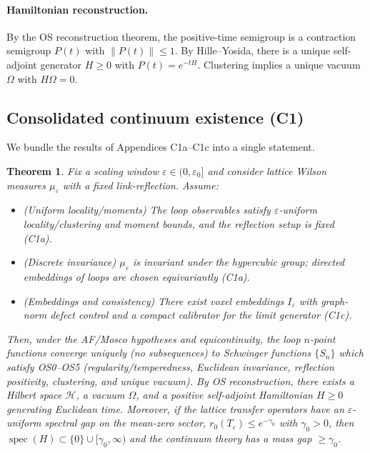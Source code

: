 \documentclass[11pt]{amsart}
\theoremstyle{plain}
\newtheorem{theorem}{Theorem}[section]
\theoremstyle{definition}
\theoremstyle{remark}
\begin{document}
\paragraph{Hamiltonian reconstruction.}
By the OS reconstruction theorem, the positive-time semigroup is a contraction semigroup $P(t)$ with $\lVert P(t)\rVert\le 1$. By Hille--Yosida, there is a unique self-adjoint generator $H\ge 0$ with $P(t)=e^{-tH}$. Clustering implies a unique vacuum $\Omega$ with $H\Omega=0$.

\subsection*{Consolidated continuum existence (C1)}

We bundle the results of Appendices C1a--C1c into a single statement.

\begin{theorem}
Fix a scaling window $\varepsilon\in(0,\varepsilon_0]$ and consider lattice Wilson measures $\mu_\varepsilon$ with a fixed link-reflection. Assume:
\begin{itemize}
  \item (Uniform locality/moments) The loop observables satisfy $\varepsilon$-uniform locality/clustering and moment bounds, and the reflection setup is fixed (C1a).
  \item (Discrete invariance) $\mu_\varepsilon$ is invariant under the hypercubic group; directed embeddings of loops are chosen equivariantly (C1a).
  \item (Embeddings and consistency) There exist voxel embeddings $I_\varepsilon$ with graph-norm defect control and a compact calibrator for the limit generator (C1c).
\end{itemize}
Then, under the AF/Mosco hypotheses and equicontinuity, the loop $n$-point functions converge \emph{uniquely} (no subsequences) to Schwinger functions $\{S_n\}$ which satisfy OS0--OS5 (regularity/temperedness, Euclidean invariance, reflection positivity, clustering, and unique vacuum). By OS reconstruction, there exists a Hilbert space $\mathcal H$, a vacuum $\Omega$, and a positive self-adjoint Hamiltonian $H\ge 0$ generating Euclidean time.
Moreover, if the lattice transfer operators have an $\varepsilon$-uniform spectral gap on the mean-zero sector, $r_0(T_\varepsilon)\le e^{-\gamma_0}$ with $\gamma_0>0$, then $\operatorname{spec}(H)\subset\{0\}\cup[\gamma_0,\infty)$ and the continuum theory has a mass gap $\ge \gamma_0$.
\end{theorem}
\end{document}
